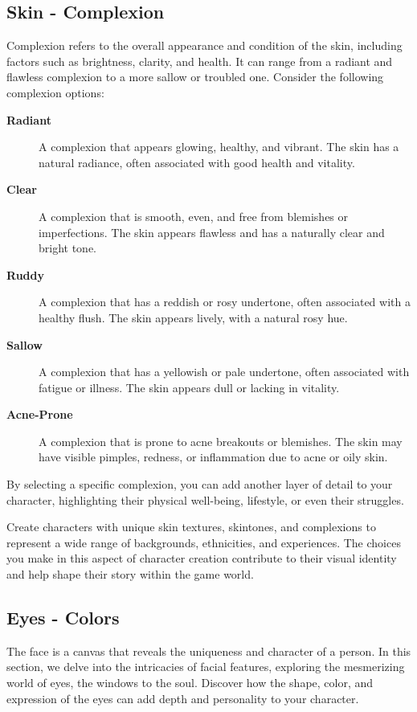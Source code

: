 \documentclass[12pt]{book}
\begin{document}
\subsection{\textbf{Skin  - Complexion}}

Complexion refers to the overall appearance and condition of the skin, including factors such as brightness, clarity, and health. It can range from a radiant and flawless complexion to a more sallow or troubled one. Consider the following complexion options:

\begin{description}
    \item[\textbf{Radiant}] A complexion that appears glowing, healthy, and vibrant. The skin has a natural radiance, often associated with good health and vitality.
    \item[\textbf{Clear}] A complexion that is smooth, even, and free from blemishes or imperfections. The skin appears flawless and has a naturally clear and bright tone.
    \item[\textbf{Ruddy}] A complexion that has a reddish or rosy undertone, often associated with a healthy flush. The skin appears lively, with a natural rosy hue.
    \item[\textbf{Sallow}] A complexion that has a yellowish or pale undertone, often associated with fatigue or illness. The skin appears dull or lacking in vitality.
    \item[\textbf{Acne-Prone}] A complexion that is prone to acne breakouts or blemishes. The skin may have visible pimples, redness, or inflammation due to acne or oily skin.
\end{description}

By selecting a specific complexion, you can add another layer of detail to your character, highlighting their physical well-being, lifestyle, or even their struggles.

Create characters with unique skin textures, skintones, and complexions to represent a wide range of backgrounds, ethnicities, and experiences. The choices you make in this aspect of character creation contribute to their visual identity and help shape their story within the game world.

\subsection{\textbf{Eyes - Colors}}

The face is a canvas that reveals the uniqueness and character of a person. In this section, we delve into the intricacies of facial features, exploring the mesmerizing world of eyes, the windows to the soul. Discover how the shape, color, and expression of the eyes can add depth and personality to your character.
\end{document}

